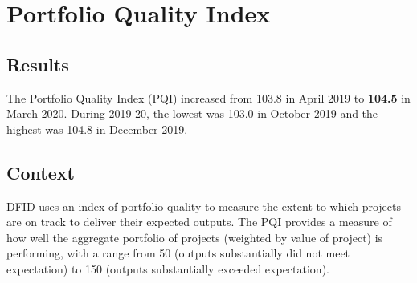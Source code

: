 \chapter{Portfolio Quality Index}

\section*{}


\thispagestyle{empty}


\section{Results}
The Portfolio Quality Index (PQI) increased from 103.8 in April 2019 to \textbf{104.5} in March 2020. %
During 2019-20, the lowest was 103.0 in October 2019 and the highest was 104.8 in December 2019. %


\section{Context}
DFID uses an index of portfolio quality to measure the extent to which projects are on track to deliver their expected outputs. %
The PQI provides a measure of how well the aggregate portfolio of projects (weighted by value of project) is performing, with a range from 50 (outputs substantially did not meet expectation) to 150 (outputs substantially exceeded expectation). %


\newpage
